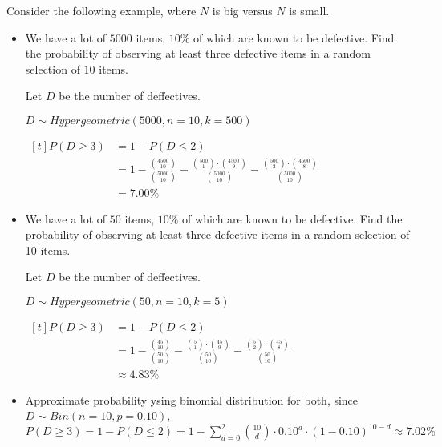 \begin{example}
    Consider the following example, where $N$ is big versus $N$ is small. 

    \begin{itemize}
        \item We have a lot of $5000$ items, $10\%$ of which are known to be defective. Find the probability of observing at least three defective items in a random selection of $10$ items.

        Let $D$ be the number of deffectives. 

        $D \sim Hypergeometric(5000, n = 10, k = 500)$

        $\begin{aligned}[t]
            P(D \ge 3) 
             & = 1 - P(D \le 2) \\
             & = 1 - \frac{\binom{4500}{10}}{\binom{5000}{10}} - \frac{\binom{500}{1} \cdot \binom{4500}{9}}{\binom{5000}{10}} - \frac{\binom{500}{2} \cdot \binom{4500}{8}}{\binom{5000}{10}} \\
             & = 7.00 \%
        \end{aligned}$

        \item We have a lot of $50$ items, $10\%$ of which are known to be defective. Find the probability of observing at least three defective items in a random selection of 10 items.

        Let $D$ be the number of deffectives. 

        $D \sim Hypergeometric(50, n = 10, k = 5)$

        $\begin{aligned}[t]
            P(D \ge 3) 
             & = 1 - P(D \le 2) \\
             & = 1 - \frac{\binom{45}{10}}{\binom{50}{10}} - \frac{\binom{5}{1} \cdot \binom{45}{9}}{\binom{50}{10}} - \frac{\binom{5}{2} \cdot \binom{45}{8}}{\binom{50}{10}} \\
             & \approx 4.83 \%
        \end{aligned}$

        \item Approximate probability ysing binomial distribution for both, since $D \sim Bin(n = 10, p = 0.10)$, $P(D \ge 3) = 1 - P(D \le 2) = 1 - \sum_{d=0}^{2} \binom{10}{d} \cdot 0.10^{d} \cdot (1 - 0.10)^{10-d} \approx 7.02\%$
    \end{itemize}
\end{example}

